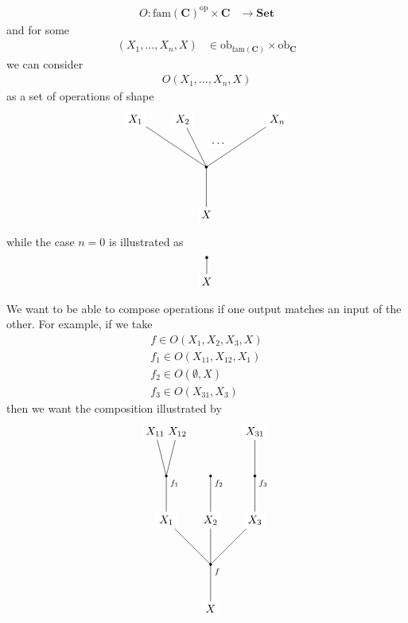 \begin{align*}
  O
  \colon
  \mathrm{fam}(\mathbf{C})^{\mathrm{op}}
  \times
  \mathbf{C}
  &\rightarrow
  \mathbf{Set}
\end{align*}
and for some
\begin{align*}
  (X_{1},\ldots,X_{n},X)
  &\in
  \mathrm{ob}_{\mathrm{fam}(\mathbf{C})}
  \times
  \mathrm{ob}_{\mathbf{C}}
\end{align*}
we can consider
\begin{align*}
  O(X_{1},\ldots,X_{n},X)
\end{align*}
as a set of operations of shape
\[
\begin{tikzpicture}[scale=0.75]
  \filldraw
    (0,0) node[fill=white] {$X$}
    --
    (0,2) circle (1.5pt) node[below right] {};
  \draw
    (0,2)
    --
    (-3,4) node[fill=white] {$X_{1}$};
  \draw
    (0,2)
    --
    (-1,4) node[fill=white] {$X_{2}$};
  \draw
    (0.5,3)
    --
    (0.5,3) node[fill=white] {$\ldots$};
  \draw
    (0,2)
    --
    (3,4) node[fill=white] {$X_{n}$};
\end{tikzpicture}
\]
while the case $n = 0$ is illustrated as
\[
\begin{tikzpicture}[scale=0.75]
  \filldraw
    (0,0) node[fill=white] {$X$}
    --
    (0,1) circle (1.5pt) node[below right] {};
\end{tikzpicture}
\]
We want to be able to compose operations if one output matches an input of the other.
For example, if we take
\begin{align*}
  f
  \in
  O(X_{1},X_{2},X_{3},X)
  \\
  f_{1}
  \in
  O(X_{11},X_{12},X_{1})
  \\
  f_{2}
  \in
  O(\emptyset,X)
  \\
  f_{3}
  \in
  O(X_{31},X_{3})
\end{align*}
then we want the composition illustrated by
\[
\begin{tikzpicture}[scale=0.70]
  \filldraw
    (0,0) node[fill=white] {$X$}
    --
    (0,2) circle (1.5pt) node[below right] {\scriptsize{$f$}};
  \draw
    (0,2)
    --
    (-2,4) node[fill=white] {$X_{1}$};
  \draw
    (0,2)
    --
    (0,4) node[fill=white] {$X_{2}$};
  \draw
    (0,2)
    --
    (2,4) node[fill=white] {$X_{3}$};
  \filldraw
    (-2,4) node[fill=white] {$X_{1}$}
    --
    (-2,6)
    circle (1.5pt) node[below right] {\scriptsize{$f_{1}$}};
  \draw
    (-2,6)
    --
    (-2.5,8) node[fill=white] {$X_{11}$};
  \draw
    (-2,6)
    --
    (-1.5,8) node[fill=white] {$X_{12}$};
  \filldraw
    (0,4) node[fill=white] {$X_{2}$}
    --
    (0,6) circle (1.5pt) node[below right] {\scriptsize{$f_{2}$}};
  \filldraw
    (2,4) node[fill=white] {$X_{3}$}
    --
    (2,6) circle (1.5pt) node[below right] {\scriptsize{$f_{3}$}};
  \draw
    (2,6)
    --
    (2,8) node[fill=white] {$X_{31}$};
\end{tikzpicture}
\]
